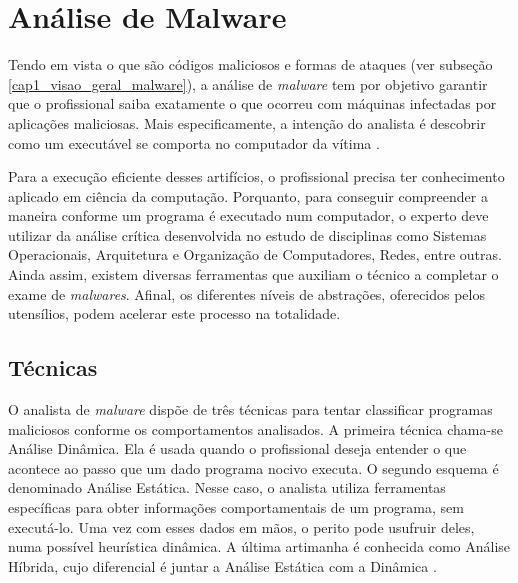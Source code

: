 \section{Análise de Malware}

    \vspace{10.5cm}

    \hspace{1cm}
    Tendo em vista o que são códigos maliciosos e formas de ataques (ver subseção \ref{cap1_visao_geral_malware}), a análise de \textit{malware} tem por objetivo garantir que o profissional saiba exatamente o que ocorreu com máquinas infectadas por aplicações maliciosas. Mais especificamente, a intenção do analista é descobrir como um executável se comporta no computador da vítima \cite{sikorski2012}.
    
    \vspace{4mm}
    
    \hspace{1cm}
    Para a execução eficiente desses artifícios, o profissional precisa ter conhecimento aplicado em ciência da computação. Porquanto, para conseguir compreender a maneira conforme um programa é executado num computador, o experto deve utilizar da análise crítica desenvolvida no estudo de disciplinas como Sistemas Operacionais, Arquitetura e Organização de Computadores, Redes, entre outras. Ainda assim, existem diversas ferramentas que auxiliam o técnico a completar o exame de \textit{malwares}. Afinal, os diferentes níveis de abstrações, oferecidos pelos utensílios, podem acelerar este processo na totalidade.
    
    \subsection{Técnicas}
    
    \hspace{1cm}
    O analista de \textit{malware} dispõe de três técnicas para tentar classificar programas maliciosos conforme os comportamentos analisados. A primeira técnica chama-se Análise Dinâmica. Ela é usada quando o profissional deseja entender o que acontece ao passo que um dado programa nocivo executa. O segundo esquema é denominado Análise Estática. Nesse caso, o analista utiliza ferramentas específicas para obter informações comportamentais de um programa, sem executá-lo. Uma vez com esses dados em mãos, o perito pode usufruir deles, numa possível heurística dinâmica. A última artimanha é conhecida como Análise Híbrida, cujo diferencial é juntar a Análise Estática com a Dinâmica \cite{monteiro2018}.
        
